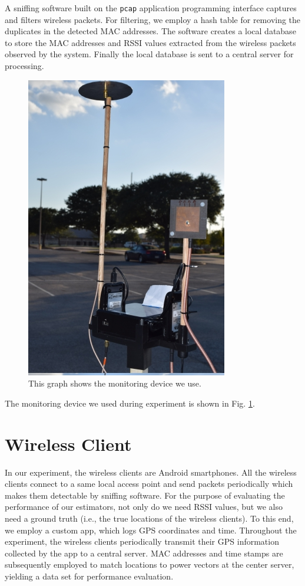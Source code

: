 A sniffing software built on the \texttt{pcap} application programming interface captures and filters wireless packets.
For filtering, we employ a hash table for removing the duplicates in the detected MAC addresses. 
The software creates a local database to store the MAC addresses and RSSI values extracted from the wireless packets observed by the system.
Finally the local database is sent to a central server for processing.
\begin{figure}[]
	\centering
	\includegraphics[scale=0.5]{Figures/DeviceSetup.jpg}
	\caption{This graph shows the monitoring device we use. }
	\label{figure: Device}
\end{figure}
The monitoring device we used during experiment is shown in Fig. \ref{figure: Device}.

\section{Wireless Client}
In our experiment, the wireless clients are Android{\texttrademark} smartphones. All the wireless clients connect to a same local access point and send packets periodically which makes them detectable by sniffing software.
For the purpose of evaluating the performance of our estimators, not only do we need RSSI values, but we also need a ground truth (i.e., the true locations of the wireless clients).
To this end, we employ a custom app, which logs GPS coordinates and time.
Throughout the experiment, the wireless clients periodically transmit their GPS information collected by the app to a central server.
MAC addresses and time stamps are subsequently employed to match locations to power vectors at the center server, yielding a data set for performance evaluation.


